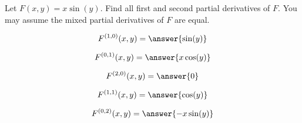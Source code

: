 \documentclass{ximera}
\author{David Guichard \and Neal Koblitz \and H. Jerome Keisler \and Albert Scheller \and Barry Balof \and Mike Wills \and Matthew Carr}
\begin{document}
\begin{exercise}




Let $F(x,y)=x\sin(y)$. Find all first and second partial derivatives of $F$. You may assume the mixed partial derivatives of $F$ are equal.

\begin{prompt}
\[
F^{(1,0)}(x,y)=\answer{\sin(y)}
\]
\end{prompt}
\begin{prompt}
\[
F^{(0,1)}(x,y)=\answer{x\cos(y)}
\]
\end{prompt}
\begin{prompt}
\[
F^{(2,0)}(x,y)=\answer{0}
\]
\end{prompt}
\begin{prompt}
\[
F^{(1,1)}(x,y)=\answer{\cos(y)}
\]
\end{prompt}
\begin{prompt}
\[
F^{(0,2)}(x,y)=\answer{-x\sin(y)}
\]
\end{prompt}

\end{exercise}
\end{document}
